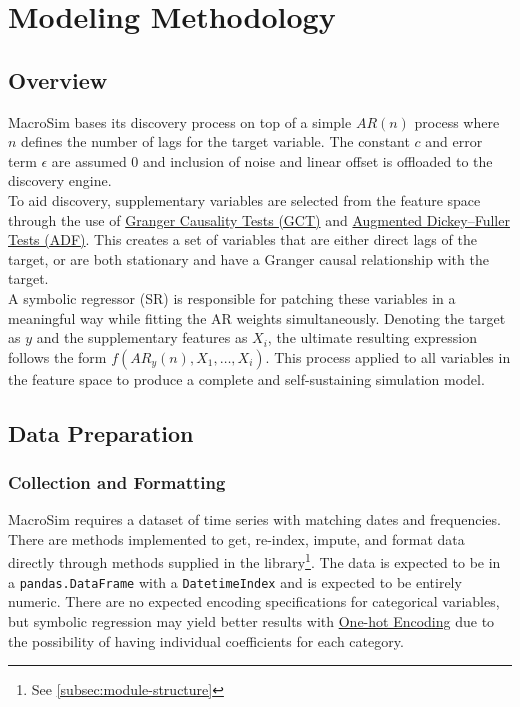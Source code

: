 
\section{Modeling Methodology}\label{sec:modeling-methodology}
\subsection{Overview}\label{subsec:overview}
    MacroSim bases its discovery process on top of a simple $AR(n)$ process where $n$ defines the number of lags for the target variable.
    The constant $c$ and error term $\epsilon$ are assumed 0 and inclusion of noise and linear offset is offloaded to the discovery engine.
    \\

    To aid discovery, supplementary variables are selected from the feature space through the use of \href{https://en.wikipedia.org/wiki/Granger_causality}{ Granger Causality Tests (GCT)} and \href{https://en.wikipedia.org/wiki/Augmented_Dickey%E2%80%93Fuller_test}{Augmented Dickey–Fuller Tests (ADF)}.
    This creates a set of variables that are either direct lags of the target, or are both stationary and have a Granger causal relationship with the target.
    \\

    A symbolic regressor (SR) is responsible for patching these variables in a meaningful way while fitting the AR weights simultaneously.
    Denoting the target as $y$ and the supplementary features as $X_i$, the ultimate resulting expression follows the form $f(AR_y(n), X_1, \dots, X_i)$.
    This process applied to all variables in the feature space to produce a complete and self-sustaining simulation model.

\subsection{Data Preparation}\label{subsec:data-preparation}
\subsubsection{Collection and Formatting}
    MacroSim requires a dataset of time series with matching dates and frequencies.
    There are methods implemented to get, re-index, impute, and format data directly through methods supplied in the library\footnote[1]{See \autoref{subsec:module-structure}\label{fn1}}.
    The data is expected to be in a \texttt{pandas.DataFrame} with a \texttt{DatetimeIndex} and is expected to be entirely numeric.
    There are no expected encoding specifications for categorical variables, but symbolic regression may yield better results with \href{https://en.wikipedia.org/wiki/One-hot}{One-hot Encoding} due to the possibility of having individual coefficients for each category.

